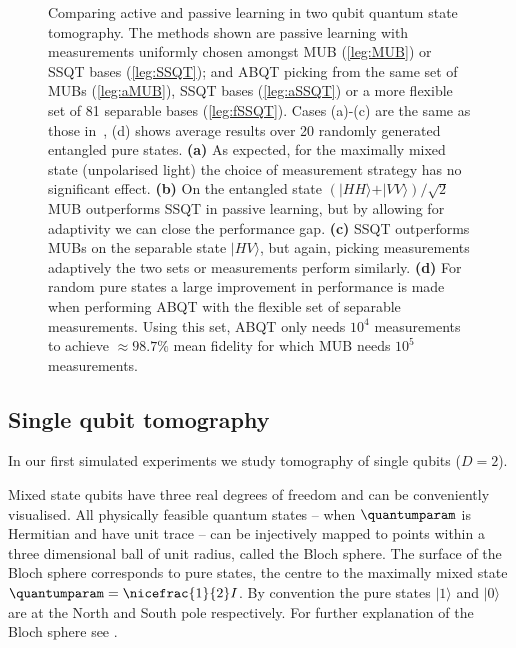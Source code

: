 \begin{figure}
	\begin{center}
	\end{center}
	\caption[Performance of the adaptive Bayesian method in two-qubit tomography]{Comparing active and passive learning in two qubit quantum state tomography. The methods shown are passive learning with measurements uniformly chosen amongst MUB (\ref{leg:MUB}) or SSQT bases (\ref{leg:SSQT}); and ABQT picking from the same set of MUBs (\ref{leg:aMUB}),  SSQT bases (\ref{leg:aSSQT}) or a more flexible set of 81 separable bases (\ref{leg:fSSQT}). Cases (a)-(c) are the same as those in\ \citep{MUBExperiment}, (d) shows average results over 20 randomly generated entangled pure states. \textbf{(a)} As expected, for the maximally mixed state (\eg unpolarised light) the choice of measurement strategy has no significant effect. \textbf{(b)} On the entangled state $(\vert HH\rangle+\vert VV\rangle)/\sqrt{2}$ MUB outperforms SSQT in passive learning, but by allowing for adaptivity we can close the performance gap. \textbf{(c)} SSQT outperforms MUBs on the separable state $\vert HV \rangle$, but again, picking measurements adaptively the two sets or measurements perform similarly. \textbf{(d)} For random pure states a large improvement in performance is made when performing ABQT with the flexible set of separable measurements. Using this set, ABQT only needs $10^4$ measurements to achieve $\approx98.7\%$ mean fidelity for which MUB needs $10^5$ measurements. \label{fig:two_qubit_results}}
\end{figure}

\subsection{Single qubit tomography}

In our first simulated experiments we study tomography of single qubits ($D=2$).

Mixed state qubits have three real degrees of freedom and can be conveniently visualised. All physically feasible quantum states -- when $\quantumparam$ is Hermitian and have unit trace -- can be injectively mapped to points within a three dimensional ball of unit radius, called the Bloch sphere. The surface of the Bloch sphere corresponds to pure states, the centre to the maximally mixed state $\quantumparam = \nicefrac{1}{2}I$. By convention the pure states $\vert 1 \rangle$ and $\vert 0 \rangle$ are at the North and South pole respectively. For further explanation of the Bloch sphere see \eg \citep[Chapter 2]{Petz2008}.

